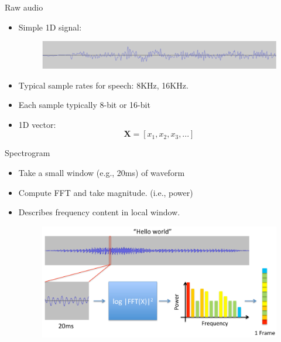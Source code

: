 \documentclass[10pt]{beamer}
\begin{document}
\begin{frame}[fragile]{Raw audio}
\begin{itemize}
	\item Simple 1D signal:
	\begin{figure}
		\includegraphics[width=\linewidth]{./images/page-15.png}
	\end{figure}
	\item Typical sample rates for speech: 8KHz, 16KHz.
	\item Each sample typically 8-bit or 16-bit
	\item 1D vector: 
	$$\textbf{X} = [x_1, x_2, x_3, ... ]$$
\end{itemize}
\end{frame}


\begin{frame}[fragile]{Spectrogram}
\begin{itemize}
\item Take a small window (e.g., 20ms) of waveform

\item Compute FFT and take magnitude. (i.e., power)
\item Describes frequency content in local window.

\begin{figure}
	\includegraphics[width=\linewidth]{./images/page-17.png}
\end{figure}
\end{itemize}
\end{frame}
\end{document}
